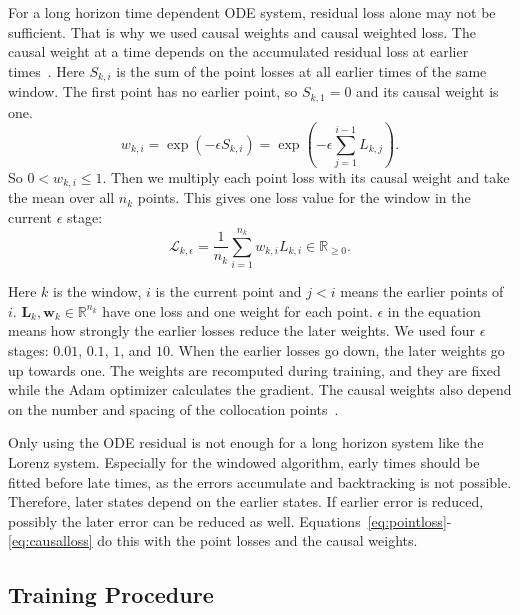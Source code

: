 \documentclass[conference,a4paper]{IEEEtran}
\begin{document}
For a long horizon time dependent ODE system, residual loss alone may not be sufficient. That is why we used causal weights and causal weighted loss. The causal weight at a time depends on the accumulated residual loss at earlier times~\cite{wang2024causal}. Here $S_{k,i}$ is the sum of the point losses at all earlier times of the same window. The first point has no earlier point, so $S_{k,1}=0$ and its causal weight is one.
\begin{equation}
w_{k,i}
=\exp\left(-\epsilon S_{k,i}\right)
=\exp\left(-\epsilon\sum_{j=1}^{i-1}L_{k,j}\right).
\label{eq:weights}
\end{equation}
So $0<w_{k,i}\leq1$. Then we multiply each point loss with its causal weight and take the mean over all $n_k$ points. This gives one loss value for the window in the current $\epsilon$ stage:
\begin{equation}
\mathcal{L}_{k,\epsilon}
=\frac{1}{n_k}
 \sum_{i=1}^{n_k}w_{k,i}L_{k,i}
\in\mathbb{R}_{\geq0}.
\label{eq:causalloss}
\end{equation}

Here $k$ is the window, $i$ is the current point and $j<i$ means the earlier points of $i$. $\mathbf{L}_k,\mathbf{w}_k\in\mathbb{R}^{n_k}$ have one loss and one weight for each point. $\epsilon$ in the equation means how strongly the earlier losses reduce the later weights. We used four $\epsilon$ stages: $0.01$, $0.1$, $1$, and $10$. When the earlier losses go down, the later weights go up towards one. The weights are recomputed during training, and they are fixed while the Adam optimizer calculates the gradient. The causal weights also depend on the number and spacing of the collocation points~\cite{wang2024causal}.

Only using the ODE residual is not enough for a long horizon system like the Lorenz system. Especially for the windowed algorithm, early times should be fitted before late times, as the errors accumulate and backtracking is not possible. Therefore, later states depend on the earlier states. If earlier error is reduced, possibly the later error can be reduced as well. Equations~\eqref{eq:pointloss}-\eqref{eq:causalloss} do this with the point losses and the causal weights. 

\subsection{Training Procedure}
\end{document}
